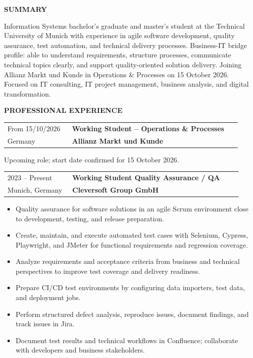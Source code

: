\documentclass[10pt,a4paper]{article}
\makeatletter
\newcommand{\sectiontitle}[1]{%
  \vspace{6pt}%
  \noindent\hspace{1.1em}\colorbox{white}{\bfseries\MakeUppercase{#1}}\par
  \vspace{1pt}%
}
\newenvironment{cvsection}[1]{%
  \Needspace{5\baselineskip}%
  \sectiontitle{#1}%
  \begin{lrbox}{\cvsectionbox}%
    \begin{minipage}{\dimexpr\textwidth-2\fboxsep-2\fboxrule-4pt\relax}%
    \vspace{2pt}
}{%
    \vspace{2pt}
    \end{minipage}%
  \end{lrbox}%
  \noindent\fbox{\usebox{\cvsectionbox}}%
  \par
}
\newcommand{\roleentry}[4]{%
  \begin{tabular*}{\linewidth}{@{}p{0.26\linewidth}@{\extracolsep{\fill}}p{0.68\linewidth}@{}}
    #1 & \textbf{#2} \\
    #3 & \textbf{#4}
  \end{tabular*}
}
\makeatother
\begin{document}
\fontsize{7.45}{8.65}\selectfont

\noindent{}

\begin{cvsection}{Summary}
Information Systems bachelor's graduate and master's student at the Technical University of Munich with experience in agile software development, quality assurance, test automation, and technical delivery processes. Business-IT bridge profile: able to understand requirements, structure processes, communicate technical topics clearly, and support quality-oriented solution delivery. Joining Allianz Markt und Kunde in Operations \& Processes on 15 October 2026. Focused on IT consulting, IT project management, business analysis, and digital transformation.
\end{cvsection}

\begin{cvsection}{Professional Experience}
\roleentry{From 15/10/2026}{Working Student -- Operations \& Processes}{Germany}{Allianz Markt und Kunde}
Upcoming role; start date confirmed for 15 October 2026.

\vspace{4pt}
\roleentry{2023 -- Present}{Working Student Quality Assurance / QA}{Munich, Germany}{Cleversoft Group GmbH}

\begin{itemize}[leftmargin=1.0em,itemsep=1pt,topsep=2pt,parsep=0pt,partopsep=0pt]
  \item Quality assurance for software solutions in an agile Scrum environment close to development, testing, and release preparation.
  \item Create, maintain, and execute automated test cases with Selenium, Cypress, Playwright, and JMeter for functional requirements and regression coverage.
  \item Analyze requirements and acceptance criteria from business and technical perspectives to improve test coverage and delivery readiness.
  \item Prepare CI/CD test environments by configuring data importers, test data, and deployment jobs.
  \item Perform structured defect analysis, reproduce issues, document findings, and track issues in Jira.
  \item Document test results and technical workflows in Confluence; collaborate with developers and business stakeholders.
\end{itemize}
\end{cvsection}
\end{document}
